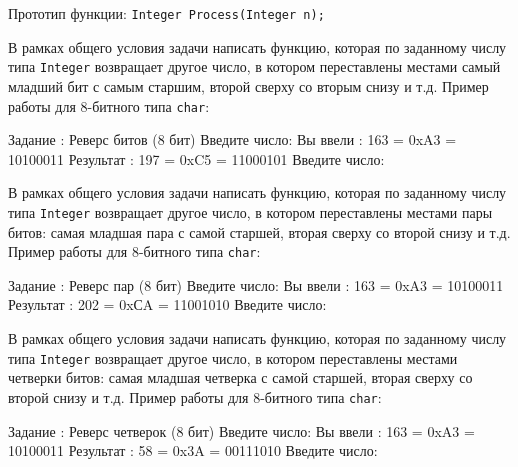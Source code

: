 Прототип функции: \texttt{Integer Process(Integer n);}


\bigskip


\begin{zztask}
В рамках общего условия задачи написать функцию, которая по заданному
числу типа \texttt{Integer} возвращает другое число, в котором переставлены местами
самый младший бит с самым старшим, второй сверху со вторым снизу и т.д.
Пример работы для 8-битного типа \texttt{char}:
\begin{zzoutput}
  Задание \thezztask: Реверс битов (8 бит)
  Введите число: 
  Вы ввели  :  163 = 0xA3 = 10100011
  Результат :  197 = 0xC5 = 11000101
  Введите число: \zzuser{ }
\end{zzoutput}
\end{zztask}


\begin{zztask}
В рамках общего условия задачи написать функцию, которая по заданному числу
типа \texttt{Integer} возвращает другое число, в котором переставлены
местами пары битов: самая младшая пара с самой старшей, вторая
сверху со второй снизу и т.д.
Пример работы для 8-битного типа \texttt{char}:
\begin{zzoutput}
  Задание \thezztask: Реверс пар (8 бит)
  Введите число: 
  Вы ввели  :  163 = 0xA3 = 10100011
  Результат :  202 = 0xСA = 11001010
  Введите число: \zzuser{ }
\end{zzoutput}
\end{zztask}


\begin{zztask}
В рамках общего условия задачи написать функцию, которая по заданному числу
типа \texttt{Integer} возвращает другое число, в котором переставлены
местами четверки битов: самая младшая четверка с самой старшей, вторая
сверху со второй снизу и т.д.
Пример работы для 8-битного типа \texttt{char}:
\begin{zzoutput}
  Задание \thezztask: Реверс четверок (8 бит)
  Введите число: 
  Вы ввели  :  163 = 0xA3 = 10100011
  Результат :   58 = 0x3A = 00111010
  Введите число: \zzuser{ }
\end{zzoutput}
\end{zztask}

